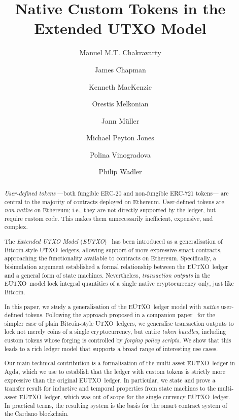 \documentclass[runningheads]{llncs}
\newcommand{\UTXO}{UTXO}
\newcommand{\EUTXO}{E\UTXO{}}
\begin{document}
\title{Native Custom Tokens in the Extended \UTXO{} Model}


\author{
  Manuel M.T. Chakravarty
  \and
  James Chapman
  \and
  Kenneth MacKenzie
  \and
  Orestis Melkonian
  \and
  Jann M\"uller
  \and
  Michael Peyton Jones
  \and
  Polina Vinogradova
  \and
  Philip Wadler
}



\maketitle

\begin{abstract}
  \emph{User-defined tokens} ---both fungible ERC-20 and non-fungible ERC-721 tokens--- are central to the majority of contracts deployed on Ethereum. User-defined tokens are \emph{non-native} on Ethereum; i.e., they are not directly supported by the ledger, but require custom code. This makes them unnecessarily inefficient, expensive, and complex.

  The \emph{Extended UTXO Model} (\kern-0.5pt\emph{\EUTXO})~\cite{eutxo-1-paper} has been introduced as a generalisation of Bitcoin-style \UTXO\ ledgers, allowing support of more expressive smart contracts, approaching the functionality available to contracts on Ethereum. Specifically, a bisimulation argument established a formal relationship between the \EUTXO\ ledger and a general form of state machines. Nevertheless, \emph{transaction outputs} in the \EUTXO\ model lock integral quantities of a single native cryptocurrency only, just like Bitcoin.

  In this paper, we study a generalisation of the \EUTXO\ ledger model with \emph{native} user-defined tokens. Following the approach proposed in a companion paper~\cite{plain-multicurrency} for the simpler case of plain Bitcoin-style \UTXO\ ledgers, we generalise transaction outputs to lock not merely coins of a single cryptocurrency, but entire \emph{token bundles,} including custom tokens whose forging is controlled by \emph{forging policy scripts.} We show that this leads to a rich ledger model that supports a broad range of interesting use cases.

  Our main technical contribution is a formalisation of the multi-asset \EUTXO\ ledger in Agda, which we use to establish that the ledger with custom tokens is strictly more expressive than the original \EUTXO\ ledger. In particular, we state and prove a transfer result for inductive and temporal properties from state machines to the multi-asset \EUTXO\ ledger, which was out of scope for the single-currency \EUTXO\ ledger. In practical terms, the resulting system is the basis for the smart contract system of the Cardano blockchain.
\end{abstract}
\end{document}
